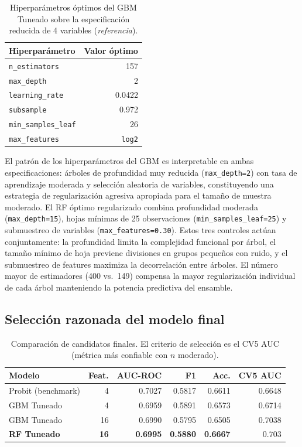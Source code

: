 \documentclass[12pt, a4paper]{article}
\begin{document}
\begin{table}[H]
\centering
\small
\begin{tabular}{lr}
\toprule
Hiperparámetro & Valor óptimo \\
\midrule
\texttt{n\_estimators} & 157 \\
\texttt{max\_depth} & 2 \\
\texttt{learning\_rate} & 0.0422 \\
\texttt{subsample} & 0.972 \\
\texttt{min\_samples\_leaf} & 26 \\
\texttt{max\_features} & \texttt{log2} \\
\bottomrule
\end{tabular}
\caption{Hiperparámetros óptimos del GBM Tuneado sobre la especificación reducida de 4 variables (\textit{referencia}).}
\label{tab:gbm_params_4var}
\end{table}

El patrón de los hiperparámetros del GBM es interpretable en ambas especificaciones: árboles de profundidad muy reducida (\texttt{max\_depth=2}) con tasa de aprendizaje moderada y selección aleatoria de variables, constituyendo una estrategia de regularización agresiva apropiada para el tamaño de muestra moderado. El RF óptimo regularizado combina profundidad moderada (\texttt{max\_depth=15}), hojas mínimas de 25 observaciones (\texttt{min\_samples\_leaf=25}) y submuestreo de variables (\texttt{max\_features=0.30}). Estos tres controles actúan conjuntamente: la profundidad limita la complejidad funcional por árbol, el tamaño mínimo de hoja previene divisiones en grupos pequeños con ruido, y el submuestreo de features maximiza la decorrelación entre árboles. El número mayor de estimadores (400 vs.\ 149) compensa la mayor regularización individual de cada árbol manteniendo la potencia predictiva del ensamble.

\subsection{Selección razonada del modelo final}

\begin{table}[H]
\centering
\small
\begin{tabular}{lrrrrr}
\toprule
Modelo & Feat. & AUC-ROC & F1 & Acc. & CV5 AUC \\
\midrule
Probit (benchmark)   & 4  & 0.7027 & 0.5817 & 0.6611 & 0.6648 \\
GBM Tuneado          & 4  & 0.6959 & 0.5891 & 0.6573 & 0.6714 \\
GBM Tuneado          & 16 & 0.6990 & 0.5795 & 0.6505 & 0.7038 \\
\textbf{RF Tuneado}  & \textbf{16} & \textbf{0.6995} & \textbf{0.5880} & \textbf{0.6667} & $\mathbf{0.703}$ \\
\bottomrule
\end{tabular}
\caption{Comparación de candidatos finales. El criterio de selección es el CV5 AUC (métrica más confiable con $n$ moderado).}
\label{tab:candidatos_final}
\end{table}
\end{document}
